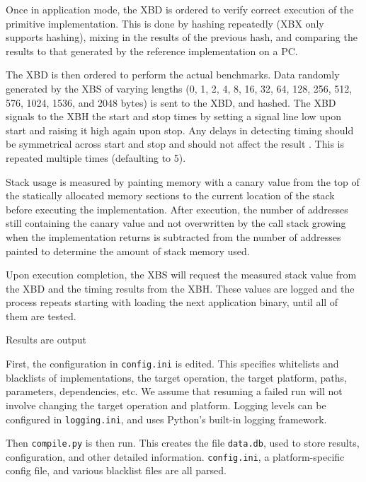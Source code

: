 \documentclass[twoside,11pt]{cergdoc}
\begin{document}
Once in application mode, the XBD is ordered to verify correct execution of the
primitive implementation. This is done by hashing repeatedly (XBX only supports hashing), mixing
in the results of the previous hash, and comparing the results to that generated
by the reference implementation on a PC. 

The XBD is then ordered to perform the actual benchmarks. Data randomly
generated by the XBS of varying lengths (0, 1, 2, 4, 8, 16, 32, 64, 128, 256, 512, 576, 1024,
1536, and 2048 bytes) is sent to the XBD, and hashed. The XBD signals to the XBH
the start and stop times by setting a signal line low upon start and raising it
high again upon stop. Any delays in detecting timing should be symmetrical
across start and stop and should not affect the result \cite{xbx}. This is
repeated multiple times (defaulting to 5). 

Stack usage is measured by painting memory with a canary value from the top of
the statically allocated memory sections to the current location of the stack
before executing the implementation. After execution, the number of addresses
still containing the canary value and not overwritten by the call stack growing
when the implementation returns is subtracted from the number of addresses
painted to determine the amount of stack memory used. 



Upon execution completion, the XBS will request the measured stack value from
the XBD and the timing results from the XBH. These values are logged and the
process repeats starting with loading the next application binary, until all of
them are tested. 

Results are output



First, the configuration in \texttt{config.ini} is edited. This specifies
whitelists and blacklists of implementations, the target operation, the target
platform, paths, parameters, dependencies, etc. We assume that resuming a failed
run will not involve changing the target operation and platform. Logging levels
can be configured in \texttt{logging.ini}, and uses Python's built-in logging
framework. 

Then \texttt{compile.py} is then run. This creates the file \texttt{data.db},
used to store results, configuration, and other detailed
information. \texttt{config.ini}, a platform-specific config file, and various
blacklist files are all parsed. 
\end{document}
